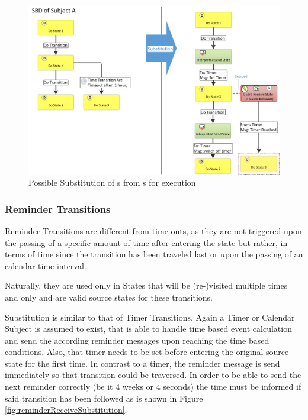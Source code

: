 \begin{figure}[hp]
	\centering
	\includegraphics[width=1.0\linewidth]{Figures/Ontology/TimeOutDoStateInterpretationSBD.png}
	\caption[Possible Substitution of s from s for execution]{Possible Substitution of s from s for execution}
	\label{fig:timeOutDoSubstitution}
\end{figure}

\subsubsection{Reminder Transitions}

Reminder Transitions are different from time-outs, as they are not triggered upon the passing of a specific amount of time after entering the state but rather, in terms of time since the transition has been traveled last or upon the passing of an calendar time interval.

Naturally, they are used only in States that will be (re-)visited multiple times and only  and  are valid source states for these transitions.

Substitution is similar to that of Timer Transitions.  Again a Timer or Calendar Subject is assumed to exist, that is able to handle time based event calculation and send the according reminder messages upon reaching the time based conditions. Also, that timer needs to be set before entering the original source state for the first time. In contrast to a timer, the reminder message is send immediately so that transition could be traversed. In order to be able to send the next reminder correctly (be it 4 weeks or 4 seconds) the time must be informed if said transition has been followed as is shown in Figure \ref{fig:reminderReceiveSubstitution}. 


